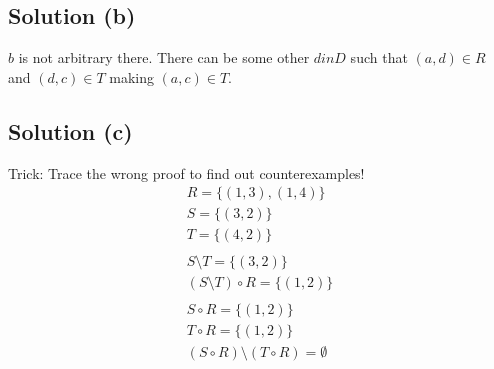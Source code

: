 \documentclass{article}
\begin{document}
\subsection{Solution (b)}
$b$ is not arbitrary there. There can be some other $d in D$ such that
$(a,d) \in R$ and $(d,c) \in T$ making $(a,c) \in T$.

\subsection{Solution (c)}
Trick: Trace the wrong proof to find out counterexamples!
\begin{align*}
R = \{(1,3),(1,4)\} \\
S = \{(3,2)\} \\
T = \{(4,2)\} \\ \\
S \setminus T = \{(3,2)\} \\
(S \setminus T) \circ R = \{(1,2)\} \\ \\
S \circ R = \{(1,2)\} \\
T \circ R = \{(1,2)\} \\
(S \circ R) \setminus (T \circ R) = \emptyset
\end{align*}
\end{document}
